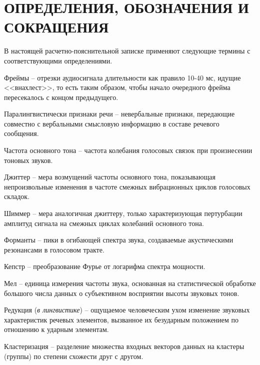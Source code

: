 \part*{ОПРЕДЕЛЕНИЯ, ОБОЗНАЧЕНИЯ И\\СОКРАЩЕНИЯ}

В настоящей расчетно-пояснительной записке применяют следующие термины с соответствующими определениями.

\begin{enumdescript}
	\item[Фреймы] -- отрезки аудиосигнала длительности как правило 10-40 мс, идущие <<внахлест>>, то есть таким
	образом, чтобы начало очередного фрейма пересекалось с концом предыдущего. 
	\item[Паралингвистически признаки речи] -- невербальные признаки, передающие совместно с вербальными смысловую информацию в составе речевого сообщения.
	\item[Частота основного тона] -- частота колебания голосовых связок при произнесении тоновых звуков.
	\item[Джиттер] -- мера возмущений частоты основного тона, показывающая непроизвольные изменения в частоте смежных вибрационных циклов голосовых складок.
	\item[Шиммер] -- мера аналогичная джиттеру, только характеризующая пертурбации амплитуд сигнала на смежных циклах колебаний основного тона.
	\item[Форманты] --  пики в огибающей спектра звука, создаваемые акустическими резонансами в голосовом тракте. 
	\item[Кепстр] -- преобразование Фурье от логарифма спектра мощности.
	\item[Мел] -- единица измерения частоты звука, основанная на статистической обработке большого числа данных о субъективном восприятии высоты звуковых тонов.
	\item[Редукция] (\textit{в лингвистике}) -- ощущаемое человеческим ухом изменение звуковых характеристик речевых элементов, вызванное их безударным положением по отношению к ударным элементам.
	\item[Кластеризация] -- разделение множества входных векторов данных на кластеры (группы) по степени схожести друг с другом.
\end{enumdescript}
